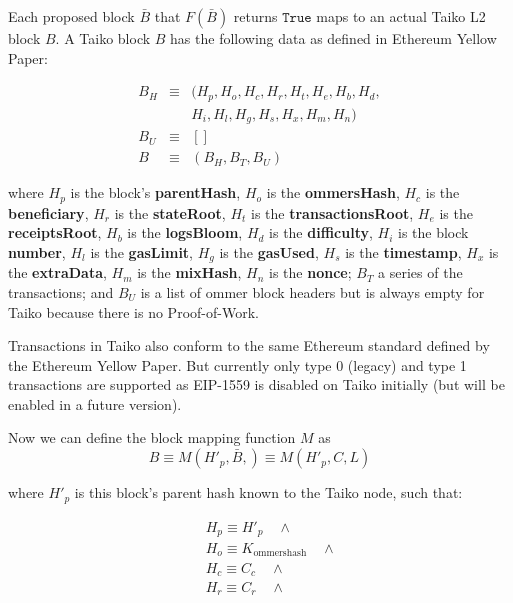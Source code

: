 \documentclass[9pt,oneside]{amsart}
\begin{document}
\begin{multicols}{2}
Each proposed block $\bar{B}$ that $F(\bar{B})$ returns $\texttt{True}$ maps to an actual Taiko L2 block $B$. A Taiko block $B$ has the following data as defined in Ethereum Yellow Paper:

\begin{eqnarray}
B_H & \equiv & (H_p, H_o, H_c, H_r, H_t, H_e, H_b, H_d, \\
\nonumber & & H_i, H_l,H_g, H_s, H_x, H_m, H_n) \\
B_U  & \equiv & [] \\
B & \equiv & (B_H, B_T, B_U)
\end{eqnarray}

where $H_p$ is the block's \textbf{parentHash}, $H_o$ is the \textbf{ommersHash}, $H_c$ is the \textbf{beneficiary}, $H_r$ is the \textbf{stateRoot}, $H_t$ is the \textbf{transactionsRoot}, $H_e$ is the \textbf{receiptsRoot}, $H_b$ is the \textbf{logsBloom}, $H_d$ is the \textbf{difficulty}, $H_i$ is the block \textbf{number}, $H_l$ is the \textbf{gasLimit}, $H_g$ is the \textbf{gasUsed}, $H_s$ is the \textbf{timestamp}, $H_x$ is the \textbf{extraData}, $H_m$ is the \textbf{mixHash}, $H_n$ is the \textbf{nonce}; $B_T$ a series of the transactions; and $B_U$ is a list of ommer block headers but is always empty for Taiko because there is no Proof-of-Work.

Transactions in Taiko also conform to the same Ethereum standard defined by the Ethereum Yellow Paper. But currently only type 0 (legacy) and type 1 transactions are supported as EIP-1559 is disabled on Taiko initially (but will be enabled in a future version).

Now we can define the block mapping function $M$ as 
\begin{equation}
B \equiv M(H'_p, \bar{B}, )  \equiv M(H'_p, C, L)
\end{equation}

where $H'_p$ is this block's parent hash known to the Taiko node, such that:

\begin{eqnarray}
& & H_p \equiv H'_p \quad \wedge \\
\nonumber & & H_o \equiv  K_{\mathrm{ommershash}} \quad \wedge \\
\nonumber& & H_c \equiv  C_c \quad \wedge \\
\nonumber& & H_r \equiv  C_r \quad \wedge \\
\end{eqnarray}









\end{multicols}
\end{document}
